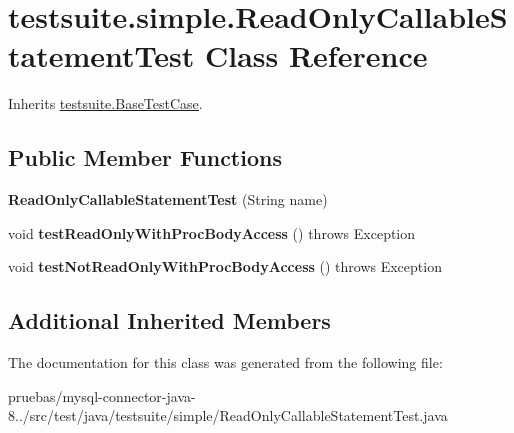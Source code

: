 \hypertarget{classtestsuite_1_1simple_1_1_read_only_callable_statement_test}{}\section{testsuite.\+simple.\+Read\+Only\+Callable\+Statement\+Test Class Reference}
\label{classtestsuite_1_1simple_1_1_read_only_callable_statement_test}


Inherits \mbox{\hyperlink{classtestsuite_1_1_base_test_case}{testsuite.\+Base\+Test\+Case}}.

\subsection*{Public Member Functions}
\begin{DoxyCompactItemize}
\item 
\mbox{\label{classtestsuite_1_1simple_1_1_read_only_callable_statement_test_a7328276b96ae1e6ed3a7ac15bcf21839}} 
{\bfseries Read\+Only\+Callable\+Statement\+Test} (String name)
\item 
\mbox{\label{classtestsuite_1_1simple_1_1_read_only_callable_statement_test_a1bfe6cc23301567c3f84a0322a6c1e17}} 
void {\bfseries test\+Read\+Only\+With\+Proc\+Body\+Access} ()  throws Exception 
\item 
\mbox{\label{classtestsuite_1_1simple_1_1_read_only_callable_statement_test_a2966846eec146e9d0a6e8fdbf6cdcc32}} 
void {\bfseries test\+Not\+Read\+Only\+With\+Proc\+Body\+Access} ()  throws Exception 
\end{DoxyCompactItemize}
\subsection*{Additional Inherited Members}


The documentation for this class was generated from the following file\+:\begin{DoxyCompactItemize}
\item 
pruebas/mysql-\/connector-\/java-\/8../src/test/java/testsuite/simple/Read\+Only\+Callable\+Statement\+Test.\+java\end{DoxyCompactItemize}
